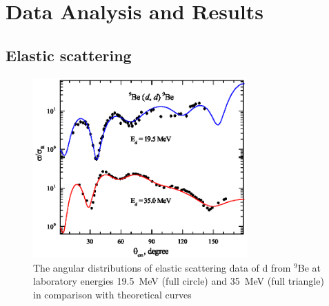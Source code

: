 \documentclass[10pt]{iopart}
\begin{document}
\section{Data Analysis and Results }
\subsection{Elastic scattering}


\begin{figure}[tp]
\centering
\includegraphics[width=8.2cm]{2H9BE.eps}
\caption{ \label{2H9BE}  \footnotesize The angular distributions of elastic scattering data of d from $^9$Be at laboratory energies 19.5~MeV (full circle) and 35~MeV (full triangle) in comparison with theoretical curves }
\end{figure}
\end{document}
